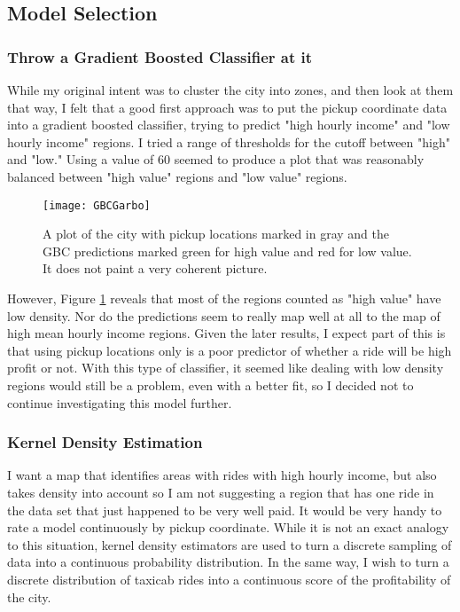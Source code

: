 \documentclass[10pt]{article} %
\begin{document}
\subsection*{Model Selection}
\subsubsection*{Throw a Gradient Boosted Classifier at it}
While my original intent was to cluster the city into zones, and then look at them that way, I felt that a good first approach was to put the pickup coordinate data into a gradient boosted classifier, trying to predict "high hourly income" and "low hourly income" regions. I tried a range of thresholds for the cutoff between "high" and "low." Using a value of 60 seemed to produce a plot that was reasonably balanced between "high value" regions and "low value" regions.

\begin{figure}[h!]
	\centering
	\texttt{[image: GBCGarbo]}
	\caption{A plot of the city with pickup locations marked in gray and the GBC predictions marked green for high value and red for low value. It does not paint a very coherent picture.}
\label{GBC}
\end{figure}

However, Figure \ref{GBC} reveals that most of the regions counted as "high value" have low density. Nor do the predictions seem to really map well at all to the map of high mean hourly income regions. Given the later results, I expect part of this is that using pickup locations only is a poor predictor of whether a ride will be high profit or not. With this type of classifier, it seemed like dealing with low density regions would still be a problem, even with a better fit, so I decided not to continue investigating this model further.

\subsubsection*{Kernel Density Estimation}
I want a map that identifies areas with rides with high hourly income, but also takes density into account so I am not suggesting a region that has one ride in the data set that just happened to be very well paid. It would be very handy to rate a model continuously by pickup coordinate. While it is not an exact analogy to this situation, kernel density estimators are used to turn a discrete sampling of data into a continuous probability distribution. In the same way, I wish to turn a discrete distribution of taxicab rides into a continuous score of the profitability of the city.
\end{document}
